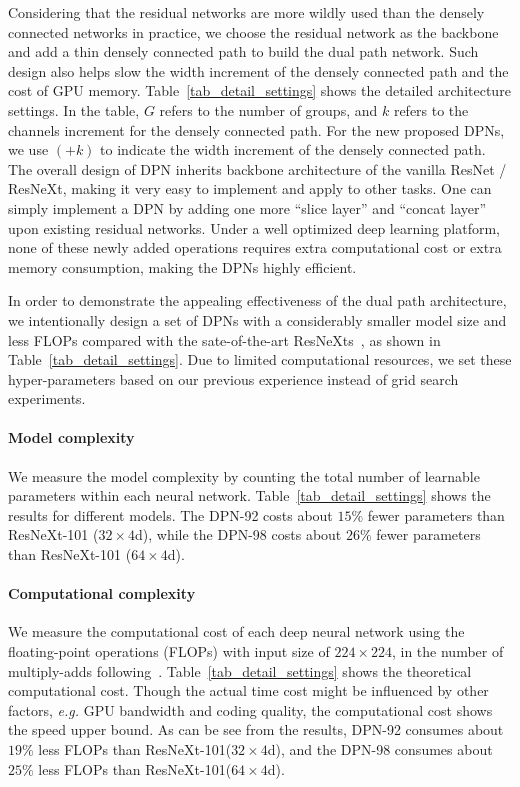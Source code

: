 \documentclass{article}
\begin{document}
Considering that the residual networks are more wildly used than the densely connected networks in practice, we choose the residual network as the backbone and add a thin densely connected path to build the dual path network. Such design also helps slow the width increment of the densely connected path and the cost of GPU memory. Table~\ref{tab_detail_settings} shows the detailed architecture settings. In the table, $G$ refers to the number of groups, and $k$ refers to the channels increment for the densely connected path. For the new proposed DPNs, we use $(+k)$ to indicate the width increment of the densely connected path. The overall design of DPN inherits backbone architecture of the vanilla ResNet / ResNeXt, making it very easy to implement and apply to other tasks. One can simply implement a DPN by adding one more ``slice layer'' and ``concat layer'' upon existing residual networks. Under a well optimized deep learning platform, none of these newly added operations requires extra computational cost or extra memory consumption, making the DPNs highly efficient.

In order to demonstrate the appealing effectiveness of the dual path architecture, we intentionally design a set of DPNs with a considerably smaller model size and less FLOPs compared with the sate-of-the-art ResNeXts~\citep{xie2016aggregated}, as shown in Table~\ref{tab_detail_settings}. Due to limited computational resources, we set these hyper-parameters based on our previous experience instead of grid search experiments. 

\vskip -0.4in
\paragraph{Model complexity} We measure the model complexity by counting the total number of learnable parameters within each neural network. Table~\ref{tab_detail_settings} shows the results for different models. The DPN-92 costs about $15\%$ fewer parameters than ResNeXt-101 ($32\times4$d), while the DPN-98 costs about $26\%$ fewer parameters than ResNeXt-101 ($64\times4$d).

\vskip -0.4in
\paragraph{Computational complexity} We measure the computational cost of each deep neural network using the floating-point operations (FLOPs) with input size of $224\times224$, in the number of multiply-adds following~\citep{xie2016aggregated}. Table~\ref{tab_detail_settings} shows the theoretical computational cost. Though the actual time cost might be influenced by other factors, \emph{e.g.} GPU bandwidth and coding quality, the computational cost shows the speed upper bound. As can be see from the results, DPN-92 consumes about $19\%$ less FLOPs than ResNeXt-101($32\times4$d), and the DPN-98 consumes about $25\%$ less FLOPs than ResNeXt-101($64\times4$d).
\vskip -0.2in
\end{document}

